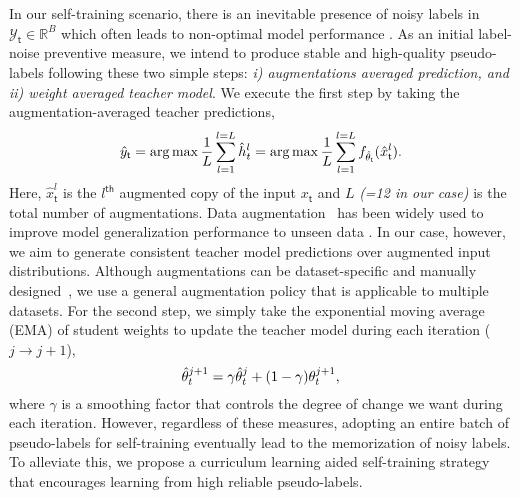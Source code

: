 \documentclass[10pt,twocolumn,letterpaper]{article}
\DeclareMathOperator*{\argmax}{arg\, max}
\begin{document}
In our self-training scenario, there is an inevitable presence of noisy labels in $\mathcal{Y}_\mathsf{t} \in \mathbb{R}^{B}$ which often leads to non-optimal model performance \cite{arpit2017closer}. As an initial label-noise preventive measure, we intend to produce stable and high-quality pseudo-labels following  these two simple steps: \emph{i) augmentations averaged prediction, and ii) weight averaged teacher model}. We execute the first step by taking the augmentation-averaged teacher predictions,  
\begin{equation}
    \Hat{y}_\mathsf{t} = \argmax  \frac{1}{L} \sum_{l=1}^{l=L} \Hat{h}^l_t = \argmax \frac{1}{L} \sum_{l=1}^{l=L} f_{\Hat{\theta}_\mathsf{t}}(\hat{x}_\mathsf{t}^l).
\end{equation}
Here, $\hat{x}_\mathsf{t}^l$ is the $l^{\mathsf{th}}$ augmented copy of the input $x_\mathsf{t}$ and $L$ \emph{(=12 in our case)} is the total number of augmentations. Data augmentation~\cite{cubuk2019autoaugment} has been widely used to improve model generalization performance to unseen data \cite{shorten2019survey,krizhevsky2017imagenet}. In our case, however, we aim to generate consistent teacher model predictions over augmented input distributions.
Although augmentations can be dataset-specific and manually designed~\cite{shorten2019survey,krizhevsky2017imagenet, SHOT}, we use a general augmentation policy that is applicable to multiple datasets. For the second step, we simply take the exponential moving average (EMA) of student weights to update the teacher model during each iteration ($j \rightarrow j+1$), 
\begin{equation}
    \Hat{\theta}_{t}^{j+1} =  \gamma \Hat{\theta}_{t}^{j} + (1-\gamma) \theta_{t}^{j+1}, \label{ema}
\end{equation}
where $\gamma$ is a smoothing factor that controls the degree of change we want during each iteration. However, regardless of these measures, adopting an entire batch of pseudo-labels for self-training eventually lead to the memorization of noisy labels. To alleviate this, we propose a curriculum learning aided self-training strategy that encourages learning from high reliable pseudo-labels. 

\vspace{-2mm}
\end{document}
